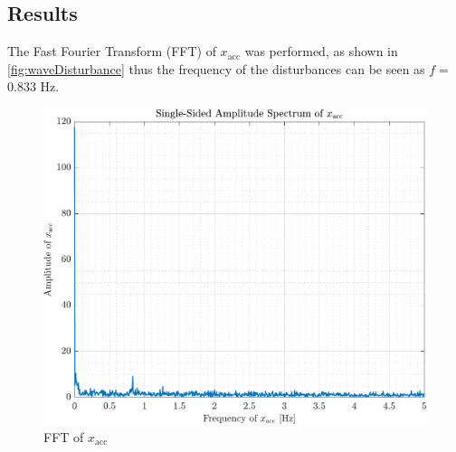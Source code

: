 \subsection*{Results}
The Fast Fourier Transform (FFT) of $x_\mathrm{acc}$ was performed, as shown in \autoref{fig:waveDisturbance} thus the frequency of the disturbances can be seen as $f =$ 0.833 Hz.
%
\begin{figure}[H]
   \includegraphics[width=.7\textwidth]{figures/waveDisturbance}
   \caption{FFT of $x_\mathrm{acc}$}
   \label{fig:waveDisturbance}
\end{figure}
